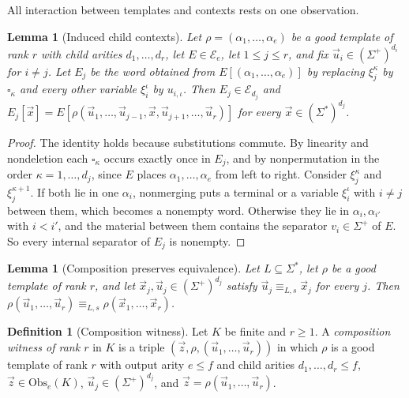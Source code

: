 \documentclass[11pt]{article}
\numberwithin{equation}{section}
\theoremstyle{plain}
\newtheorem{lemma}[theorem]{Lemma}
\theoremstyle{definition}
\newtheorem{definition}[theorem]{Definition}
\theoremstyle{remark}
\newcommand{\tuple}[1]{\vec{#1}}
\newcommand{\blank}{\square}
\begin{document}
All interaction between templates and contexts rests on one observation.

\begin{lemma}[Induced child contexts]
\label{lem:filling-identity}
Let $\rho=(\alpha_1,\ldots,\alpha_e)$ be a good template of rank $r$ with child
arities $d_1,\ldots,d_r$, let $E\in\mathcal E_e$, let $1\le j\le r$, and fix
$\tuple u_i\in(\Sigma^+)^{d_i}$ for $i\ne j$.  Let $E_j$ be the word obtained
from $E[(\alpha_1,\ldots,\alpha_e)]$ by replacing $\xi_j^\kappa$ by
$\blank_\kappa$ and every other variable $\xi_i^\iota$ by $u_{i,\iota}$.  Then
$E_j\in\mathcal E_{d_j}$ and
$E_j[\tuple x]=E[\rho(\tuple u_1,\ldots,\tuple u_{j-1},\tuple x,
\tuple u_{j+1},\ldots,\tuple u_r)]$ for every
$\tuple x\in(\Sigma^*)^{d_j}$.
\end{lemma}

\begin{proof}
The identity holds because substitutions commute.  By linearity and
nondeletion each $\blank_\kappa$ occurs exactly once in $E_j$, and by
nonpermutation in the order $\kappa=1,\ldots,d_j$, since $E$ places
$\alpha_1,\ldots,\alpha_e$ from left to right.  Consider $\xi_j^\kappa$ and
$\xi_j^{\kappa+1}$.  If both lie in one $\alpha_i$, nonmerging puts a terminal
or a variable $\xi_i^\iota$ with $i\ne j$ between them, which becomes a
nonempty word.  Otherwise they lie in $\alpha_i,\alpha_{i'}$ with $i<i'$, and
the material between them contains the separator $v_i\in\Sigma^+$ of $E$.  So
every internal separator of $E_j$ is nonempty.
\end{proof}

\begin{lemma}[Composition preserves equivalence]
\label{lem:witnessed-composition}
Let $L\subseteq\Sigma^*$, let $\rho$ be a good template of rank $r$, and let
$\tuple x_j,\tuple u_j\in(\Sigma^+)^{d_j}$ satisfy
$\tuple u_j\equiv_{L,s}\tuple x_j$ for every $j$.  Then
$\rho(\tuple u_1,\ldots,\tuple u_r)\equiv_{L,s}\rho(\tuple x_1,\ldots,\tuple x_r)$.
\end{lemma}

\begin{definition}[Composition witness]
\label{def:composition-witness}
Let $K$ be finite and $r\ge1$.  A \emph{composition witness of rank $r$} in $K$
is a triple $(\tuple z,\rho,(\tuple u_1,\ldots,\tuple u_r))$ in which $\rho$
is a good template of rank $r$ with output arity $e\le f$ and child arities
$d_1,\ldots,d_r\le f$, $\tuple z\in\mathrm{Obs}_e(K)$,
$\tuple u_j\in(\Sigma^+)^{d_j}$, and
$\tuple z=\rho(\tuple u_1,\ldots,\tuple u_r)$.
\end{definition}
\end{document}
